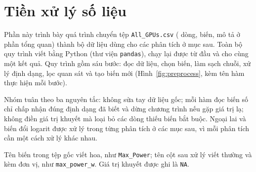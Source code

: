 %
%   

\section{Tiền xử lý số liệu}
\label{sec:preprocessing}

Phần này trình bày quá trình chuyển tệp \texttt{All\_GPUs.csv} (\PreRowsRaw{} dòng,
\PreColsRaw{} biến, mô tả ở phần tổng quan) thành bộ dữ liệu dùng cho
các phân tích ở mục sau. Toàn bộ quy trình viết bằng Python (thư viện
\texttt{pandas}), chạy lại được từ đầu và cho cùng một kết quả. Quy trình gồm sáu bước:
đọc dữ liệu, chọn biến, làm sạch chuỗi, xử lý định dạng, lọc quan sát và tạo biến mới
(Hình~\ref{fig:preprocess}, kèm tên hàm thực hiện mỗi bước).

Nhóm tuân theo ba nguyên tắc: không sửa tay dữ liệu gốc; mỗi hàm đọc biến số chỉ chấp
nhận đúng định dạng đã biết và dừng chương trình nếu gặp giá trị lạ; không điền giá trị
khuyết mà loại bỏ các dòng thiếu biến bắt buộc. Ngoại lai và biến đổi logarit được xử lý trong từng phân
tích ở các mục sau, vì mỗi phân tích cần một cách xử lý khác nhau.

Tên biến trong tệp gốc viết hoa, như \texttt{Max\_Power}; tên cột sau xử lý viết thường
và kèm đơn vị, như \texttt{max\_power\_w}. Giá trị khuyết được ghi là \texttt{NA}.

